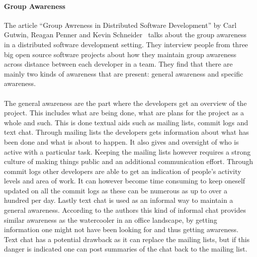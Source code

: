 \documentclass{article}
\begin{document}
\paragraph{Group Awareness}
The article ``Group Awreness in Distributed Software Development'' by Carl Gutwin, Reagan Penner and Kevin Schneider~\cite{Gutwin} talks about the group awareness in a distributed software development setting. They interview people from three big open source software projects about how they maintain group awareness across distance between each developer in a team. They find that there are mainly two kinds of awareness that are present: general awareness and specific awareness.

\paragraph{}The general awareness are the part where the developers get an overview of the project. This includes what are being done, what are plans for the project as a whole and such. This is done textual aids such as mailing lists, commit logs and text chat. Through mailing lists the developers gets information about what has been done and what is about to happen. It also gives and oversight of who is active with a particular task. Keeping the mailing lists however requires a strong culture of making things public and an additional communication effort. Through commit logs other developers are able to get an indication of people's activity levels and area of work. It can however become time consuming to keep oneself updated on all the commit logs as these can be numerous as up to over a hundred per day. Lastly text chat is used as an informal way to maintain a general awareness. According to the authors this kind of informal chat provides similar awareness as the watercooler in an office landscape, by getting information one might not have been looking for and thus getting awareness. Text chat has a potential drawback as it can replace the mailing lists, but if this danger is indicated one can post summaries of the chat back to the mailing list. 
\end{document}
